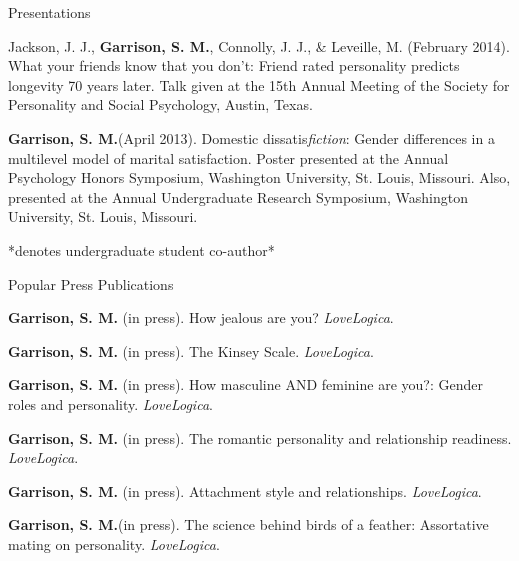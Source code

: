 \documentclass {resume}
\newcommand{\meb}{{\bf Garrison, S. M.}\xspace}
\begin{document}
\begin{rSection}{\textrm{Presentations}}
\begin{etaremune}
\item\begin{samepage}Jackson, J. J., \textbf{Garrison, S. M.}, Connolly, J. J., \& Leveille, M. (February 2014). What your friends know that you don't: Friend rated personality predicts longevity 70 years later. Talk given at the 15th Annual Meeting of the Society for Personality and  Social Psychology, Austin, Texas.\end{samepage}
\item\begin{samepage}\meb (April 2013). Domestic dissatis{\em fiction}: Gender differences in a multilevel model of marital satisfaction. Poster presented at the Annual Psychology Honors Symposium, Washington  University, St. Louis, Missouri. Also, presented at the Annual Undergraduate Research Symposium, Washington University, St. Louis, Missouri.\end{samepage}
\end{etaremune}\vspace{-3mm}\begin{center}\footnotesize{*denotes undergraduate student co-author*}\end{center} \vspace{-3mm}%
\end{rSection}
\pagestyle{myheadings}
\begin{samepage}\begin{rSection}{\textrm{Popular Press Publications}} \begin{etaremune}
\item\textbf{Garrison, S. M.} (in press). How jealous are you? \textit{LoveLogica}.
\item\textbf{Garrison, S. M.} (in press). The Kinsey Scale. \textit{LoveLogica}.%
\item\textbf{Garrison, S. M.} (in press). How masculine AND feminine are you?: Gender roles and personality. \textit{LoveLogica}.
\item\textbf{Garrison, S. M.} (in press). %
The romantic personality and relationship readiness. \textit{LoveLogica}.
\item\textbf{Garrison, S. M.} (in press). Attachment style and relationships. \textit{LoveLogica}.
\item\meb(in press). The science behind birds of a feather: Assortative mating on personality. \textit{LoveLogica}.
\end{etaremune}\end{rSection}\end{samepage}
\end{document}
